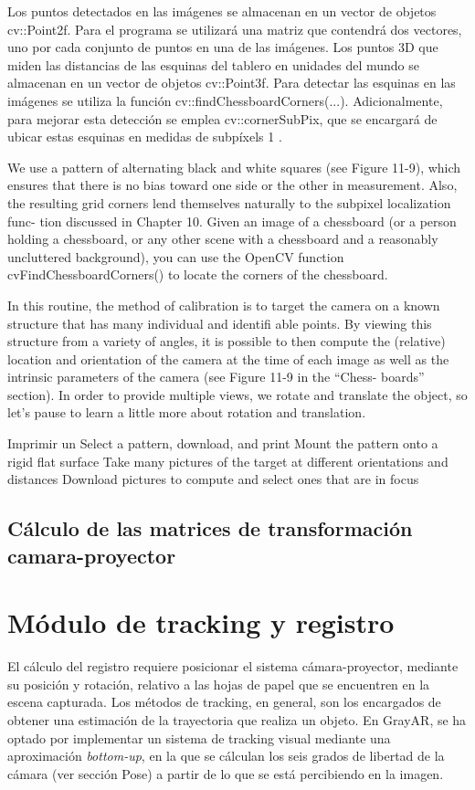 Los puntos detectados en las imágenes se almacenan en un vector de objetos cv::Point2f. Para el programa se utilizará una matriz que contendrá dos vectores, uno por cada conjunto de puntos en una de las imágenes. Los puntos 3D que miden las distancias de las esquinas del tablero en unidades del mundo se almacenan en un vector de objetos cv::Point3f. Para detectar las esquinas en las imágenes se utiliza la función cv::findChessboardCorners(...). Adicionalmente, para mejorar esta detección se emplea cv::cornerSubPix, que se
encargará de ubicar estas esquinas en medidas de subpíxels 1 .


We use a pattern of alternating black and white squares (see Figure 11-9), 
which ensures that there is no bias toward one side or the other in measurement. Also,
the resulting grid corners lend themselves naturally to the subpixel localization func-
tion discussed in Chapter 10.
Given an image of a chessboard (or a person holding a chessboard, or any other scene
with a chessboard and a reasonably uncluttered background), you can use the OpenCV
function cvFindChessboardCorners() to locate the corners of the chessboard.


In this routine, the method of
calibration is to target the camera on a known structure that has many individual and
identifi able points. By viewing this structure from a variety of angles, it is possible to
then compute the (relative) location and orientation of the camera at the time of each
image as well as the intrinsic parameters of the camera (see Figure 11-9 in the “Chess-
boards” section). In order to provide multiple views, we rotate and translate the object,
so let’s pause to learn a little more about rotation and translation.

Imprimir un Select a pattern, download, and print
Mount the pattern onto a rigid flat surface
Take many pictures of the target at different orientations and distances
Download pictures to compute and select ones that are in focus
\subsection{Cálculo de las matrices de transformación camara-proyector}


\section{Módulo de tracking y registro}
El cálculo del registro requiere posicionar el sistema cámara-proyector, mediante su posición y rotación, relativo a las hojas de papel que se encuentren en la escena capturada. Los métodos de tracking, en general, son los encargados de obtener una estimación de la trayectoria que realiza un objeto. En GrayAR, se ha optado por implementar un sistema de tracking visual mediante una aproximación \textit{bottom-up}\cite{marimon}, en la que se cálculan los seis grados de libertad de la cámara (ver sección Pose) a partir de lo que se está percibiendo en la imagen. 

